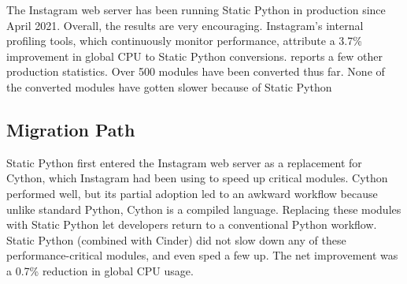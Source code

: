\documentclass[english,cleveref,submission]{programming}
\newcommand{\SP}{Static Python}
\begin{document}





The Instagram web server has been running \SP{} in production since April 2021.
Overall, the results are very encouraging.
Instagram's internal profiling tools, which continuously monitor
performance, attribute a 3.7\% improvement in global CPU to \SP{} conversions.
 reports a few other production statistics.
Over 500 modules have been converted thus far.
None of the converted modules have gotten slower because of \SP{}


\subsection{Migration Path}

\SP{} first entered the Instagram web server as a replacement for Cython,
which Instagram had been using to speed up critical modules.
Cython performed well, but its partial adoption led to an awkward workflow
because unlike standard Python, Cython is a compiled language.
Replacing these modules with \SP{} let developers return to a conventional
Python workflow.
\SP{} (combined with Cinder) did not slow down any of these
performance-critical modules, and even sped a few up.
The net improvement was a 0.7\% reduction in global CPU usage.
\end{document}
